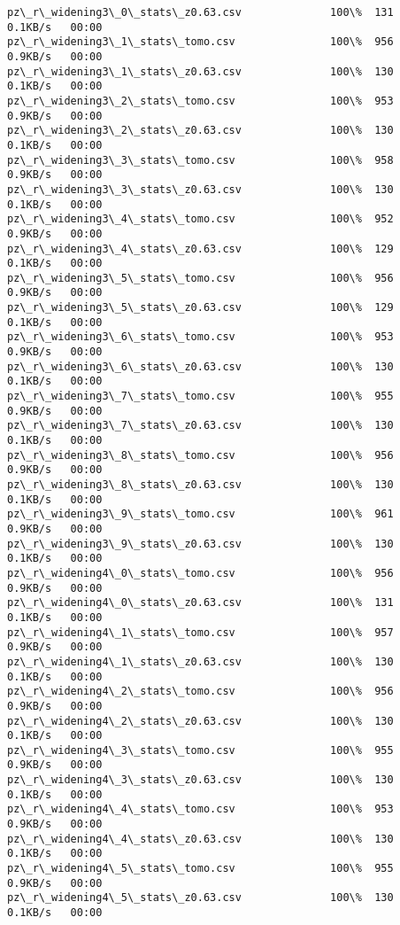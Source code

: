 \documentclass[11pt]{article}
\begin{document}
\begin{Verbatim}[commandchars=\\\{\}]
pz\_r\_widening3\_0\_stats\_z0.63.csv              100\%  131     0.1KB/s   00:00    
pz\_r\_widening3\_1\_stats\_tomo.csv               100\%  956     0.9KB/s   00:00    
pz\_r\_widening3\_1\_stats\_z0.63.csv              100\%  130     0.1KB/s   00:00    
pz\_r\_widening3\_2\_stats\_tomo.csv               100\%  953     0.9KB/s   00:00    
pz\_r\_widening3\_2\_stats\_z0.63.csv              100\%  130     0.1KB/s   00:00    
pz\_r\_widening3\_3\_stats\_tomo.csv               100\%  958     0.9KB/s   00:00    
pz\_r\_widening3\_3\_stats\_z0.63.csv              100\%  130     0.1KB/s   00:00    
pz\_r\_widening3\_4\_stats\_tomo.csv               100\%  952     0.9KB/s   00:00    
pz\_r\_widening3\_4\_stats\_z0.63.csv              100\%  129     0.1KB/s   00:00    
pz\_r\_widening3\_5\_stats\_tomo.csv               100\%  956     0.9KB/s   00:00    
pz\_r\_widening3\_5\_stats\_z0.63.csv              100\%  129     0.1KB/s   00:00    
pz\_r\_widening3\_6\_stats\_tomo.csv               100\%  953     0.9KB/s   00:00    
pz\_r\_widening3\_6\_stats\_z0.63.csv              100\%  130     0.1KB/s   00:00    
pz\_r\_widening3\_7\_stats\_tomo.csv               100\%  955     0.9KB/s   00:00    
pz\_r\_widening3\_7\_stats\_z0.63.csv              100\%  130     0.1KB/s   00:00    
pz\_r\_widening3\_8\_stats\_tomo.csv               100\%  956     0.9KB/s   00:00    
pz\_r\_widening3\_8\_stats\_z0.63.csv              100\%  130     0.1KB/s   00:00    
pz\_r\_widening3\_9\_stats\_tomo.csv               100\%  961     0.9KB/s   00:00    
pz\_r\_widening3\_9\_stats\_z0.63.csv              100\%  130     0.1KB/s   00:00    
pz\_r\_widening4\_0\_stats\_tomo.csv               100\%  956     0.9KB/s   00:00    
pz\_r\_widening4\_0\_stats\_z0.63.csv              100\%  131     0.1KB/s   00:00    
pz\_r\_widening4\_1\_stats\_tomo.csv               100\%  957     0.9KB/s   00:00    
pz\_r\_widening4\_1\_stats\_z0.63.csv              100\%  130     0.1KB/s   00:00    
pz\_r\_widening4\_2\_stats\_tomo.csv               100\%  956     0.9KB/s   00:00    
pz\_r\_widening4\_2\_stats\_z0.63.csv              100\%  130     0.1KB/s   00:00    
pz\_r\_widening4\_3\_stats\_tomo.csv               100\%  955     0.9KB/s   00:00    
pz\_r\_widening4\_3\_stats\_z0.63.csv              100\%  130     0.1KB/s   00:00    
pz\_r\_widening4\_4\_stats\_tomo.csv               100\%  953     0.9KB/s   00:00    
pz\_r\_widening4\_4\_stats\_z0.63.csv              100\%  130     0.1KB/s   00:00    
pz\_r\_widening4\_5\_stats\_tomo.csv               100\%  955     0.9KB/s   00:00    
pz\_r\_widening4\_5\_stats\_z0.63.csv              100\%  130     0.1KB/s   00:00    

\end{Verbatim}
\end{document}
